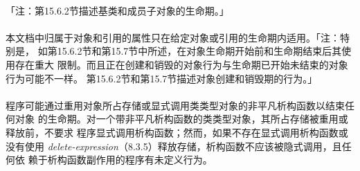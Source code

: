 \paragraph{}
「注：第15.6.2节描述基类和成员子对象的生命期。」

\paragraph{}
本文档中归属于对象和引用的属性只在给定对象或引用的生命期内适用。「注：特别是，
如第15.6.2节和第15.7节中所述，在对象生命期开始前和生命期结束后其使用存在重大
限制。而且正在创建和销毁的对象行为与生命期已开始未结束的对象行为可能不一样。
第15.6.2节和第15.7节描述对象创建和销毁期的行为。」

\paragraph{}
程序可能通过重用对象所占存储或显式调用类类型对象的非平凡析构函数以结束任何对象
的生命期。对一个带非平凡析构函数的类类型对象，其所占存储被重用或释放前，不要求
程序显式调用析构函数；然而，如果不存在显式调用析构函数或没有使用
\textit{delete-expression}（8.3.5）释放存储，析构函数不应该被隐式调用，且任何依
赖于析构函数副作用的程序有未定义行为。

